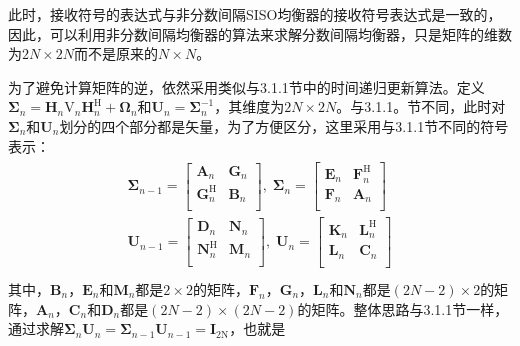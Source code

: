 此时，接收符号的表达式与非分数间隔SISO均衡器的接收符号表达式是一致的，因此，可以利用非分数间隔均衡器的算法来求解分数间隔均衡器，只是矩阵的维数为$2N\times
2N$而不是原来的$N\times N$。

为了避免计算矩阵的逆，依然采用类似与3.1.1节中的时间递归更新算法。定义$\boldsymbol{\Sigma}_n=\mathbf{H}_n\mathrm{V}_n\mathbf{H}_n^{\mathrm{H}}+\boldsymbol{\Omega}_n$和$\mathbf{U}_n=\boldsymbol{\Sigma}_n^{-1}$，其维度为$2N\times
2N$。与3.1.1。节不同，此时对$\boldsymbol{\Sigma}_n$和$\mathbf{U}_n$划分的四个部分都是矢量，为了方便区分，这里采用与3.1.1节不同的符号表示：
\begin{eqnarray}
    \begin{array}{c}
        \boldsymbol{\Sigma}_{n-1}=
        \begin{bmatrix}
            \mathbf{A}_n&\mathbf{G}_n\\
            \mathbf{G}_n^{\mathrm{H}}&\mathbf{B}_n\\
        \end{bmatrix},\;
        \boldsymbol{\Sigma}_n=
        \begin{bmatrix}
            \mathbf{E}_n&\mathbf{F}_n^{\mathrm{H}}\\
            \mathbf{F}_n&\mathbf{A}_n\\
        \end{bmatrix}\\
        \mathbf{U}_{n-1}=
        \begin{bmatrix}
            \mathbf{D}_n&\mathbf{N}_n\\
            \mathbf{N}_n^{\mathrm{H}}&\mathbf{M}_n\\
        \end{bmatrix},\;
        \mathbf{U}_n=
        \begin{bmatrix}
            \mathbf{K}_n&\mathbf{L}_n^{\mathrm{H}}\\
            \mathbf{L}_n&\mathbf{C}_n\\
        \end{bmatrix}\\
    \end{array}
    \label{equ:3.43}
\end{eqnarray}
其中，$\mathbf{B}_n\mbox{，}\mathbf{E}_n\mbox{和}\mathbf{M}_n$都是$2\times
2$的矩阵，$\mathbf{F}_n\mbox{，}\mathbf{G}_n\mbox{，}\mathbf{L}_n\mbox{和}\mathbf{N}_n$都是$(2N-2)\times
2$的矩阵，$\mathbf{A}_n\mbox{，}\mathbf{C}_n\mbox{和}\mathbf{D}_n$都是$(2N-2)\times(2N-2)$的矩阵。整体思路与3.1.1节一样，通过求解$\boldsymbol{\Sigma}_n\mathbf{U}_n=\boldsymbol{\Sigma}_{n-1}\mathbf{U}_{n-1}=\mathbf{I}_{2\mathrm{N}}$，也就是
